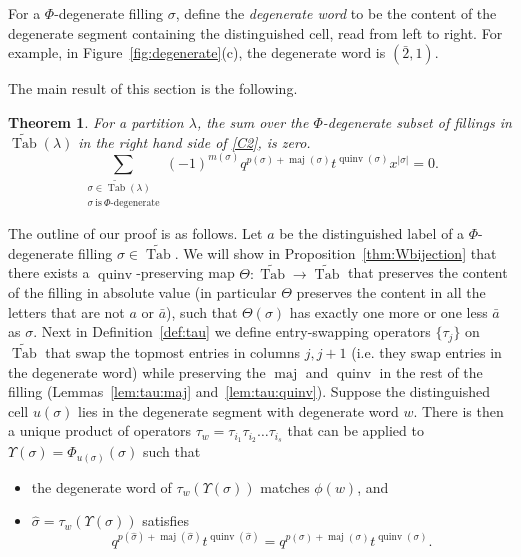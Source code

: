 \documentclass[11pt]{article}
\newtheorem{theorem}[theo]{Theorem}
\theoremstyle{definition}
\numberwithin{equation}{section}
\DeclareMathOperator{\PQT}{Tab}
\DeclareMathOperator{\maj}{maj}
\DeclareMathOperator{\quinv}{quinv}
\begin{document}
\begin{defn}For a $\Phi$-degenerate filling $\sigma$, define the \emph{degenerate word} to be the content of the degenerate segment containing the distinguished cell, read from left to right. For example, in Figure~\ref{fig:degenerate}(c), the degenerate word is $(\bar{2},1)$.
\end{defn}

The main result of this section is the following.

\begin{theorem}
\label{prop:Phi-degenerate}
For a partition $\lambda$, the sum over the $\Phi$-degenerate subset of fillings in $\widetilde{\PQT}(\lambda)$ in the right hand side of \eqref{C2}, is zero.
\[
\sum_{\substack{\sigma\in\widetilde{\PQT}(\lambda)\\\sigma\ \text{is}\ \Phi\text{-degenerate}}} (-1)^{m(\sigma)} q^{p(\sigma)+\maj(\sigma)}t^{\quinv(\sigma)}x^{|\sigma|} =0.
\]
\end{theorem} 


The outline of our proof is as follows. Let $a$ be the distinguished label of a $\Phi$-degenerate filling $\sigma\in\widetilde{\PQT}$. We will show in Proposition~\ref{thm:Wbijection} that there exists a $\quinv$-preserving map $\Theta:\widetilde{\PQT}\rightarrow \widetilde{\PQT}$ that preserves the content of the filling in absolute value (in particular $\Theta$ preserves the content in all the letters that are not $a$ or $\bar{a}$), such that $\Theta(\sigma)$ has exactly one more or one less $\bar{a}$ as $\sigma$. Next in Definition~\ref{def:tau} we define entry-swapping operators $\{\tau_j\}$ on $\widetilde{\PQT}$ that swap the topmost entries in columns $j,j+1$ (i.e. they swap entries in the degenerate word) while preserving the $\maj$ and $\quinv$ in the rest of the filling (Lemmas~\ref{lem:tau:maj} and~\ref{lem:tau:quinv}). Suppose the distinguished cell $u(\sigma)$ lies in the degenerate segment with degenerate word $w$. There is then a unique product of operators $\tau_w=\tau_{i_1}\tau_{i_2}\ldots\tau_{i_s}$ that can be applied to $\Upsilon(\sigma)=\Phi_{u(\sigma)}(\sigma)$ such that
\begin{itemize}
\item the degenerate word of $\tau_w(\Upsilon(\sigma))$ matches $\phi(w)$, and 
\item $\widehat{\sigma} = \tau_w(\Upsilon(\sigma))$ satisfies 
\[q^{p(\widehat{\sigma})+\maj(\widehat{\sigma})}t^{\quinv(\widehat{\sigma})} = q^{p(\sigma)+\maj(\sigma)}t^{\quinv(\sigma)}.\]
\end{itemize}
\end{document}
